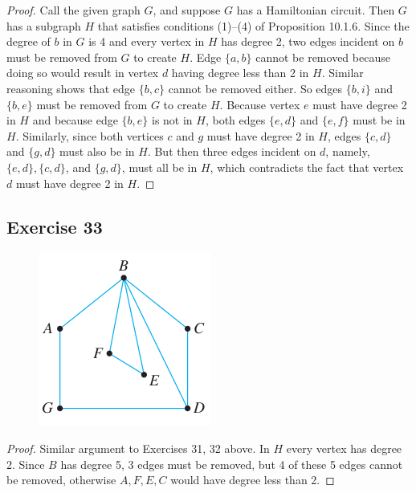 \documentclass[14pt]{extarticle}
\begin{document}
\begin{proof}
    Call the given graph \(G\), and suppose \(G\) has a Hamiltonian circuit. Then \(G\) has a subgraph \(H\) that
    satisfies conditions (1)–(4) of Proposition 10.1.6. Since the degree of \(b\) in \(G\) is 4 and every vertex in \(H\) has
    degree 2, two edges incident on \(b\) must be removed from \(G\) to create \(H\). Edge \(\{a, b\}\) cannot be removed
    because doing so would result in vertex \(d\) having degree less than 2 in \(H\). Similar reasoning shows that edge
    \(\{b, c\}\) cannot be removed either. So edges \(\{b, i\}\) and \(\{b, e\}\) must be removed from \(G\) to create \(H\).
    Because vertex \(e\) must have degree 2 in \(H\) and because edge \(\{b, e\}\) is not in \(H\), both edges \(\{e, d\}\) and
    \(\{e, f\}\) must be in \(H\). Similarly, since both vertices \(c\) and \(g\) must have degree 2 in \(H\), edges \(\{c,d\}\)
    and \(\{g, d\}\) must also be in \(H\). But then three edges incident on \(d\), namely, \(\{e, d\}, \{c, d\}\), and
    \(\{g, d\}\), must all be in \(H\), which contradicts the fact that vertex \(d\) must have degree 2 in \(H\).
\end{proof}

\subsection{Exercise 33}
\begin{figure}[ht!]
    \centering
    \includegraphics[scale=0.6]{../images/10.1.33.png}
\end{figure}

\begin{proof}
    Similar argument to Exercises 31, 32 above. In \(H\) every vertex has degree 2. Since \(B\) has degree 5, 3 edges must be
    removed, but 4 of these 5 edges cannot be removed, otherwise \(A,F,E,C\) would have degree less than 2.
\end{proof}
\end{document}
